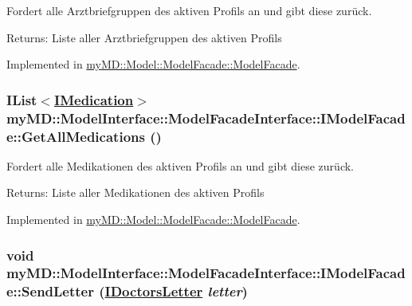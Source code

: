 Fordert alle Arztbriefgruppen des aktiven Profils an und gibt diese zur\"{u}ck. 

\begin{Desc}
\item[Returns:]Liste aller Arztbriefgruppen des aktiven Profils\end{Desc}


Implemented in \hyperlink{classmy_m_d_1_1_model_1_1_model_facade_1_1_model_facade_5975f81012b1229ab03cbfa932f3a8ae}{my\-MD::Model::Model\-Facade::Model\-Facade}.\hypertarget{interfacemy_m_d_1_1_model_interface_1_1_model_facade_interface_1_1_i_model_facade_ecff6715a9c8e9604242cc7a688c9939}{
\subsubsection[GetAllMedications]{\setlength{\rightskip}{0pt plus 5cm}IList$<$\hyperlink{interfacemy_m_d_1_1_model_interface_1_1_data_model_interface_1_1_i_medication}{IMedication}$>$ my\-MD::Model\-Interface::Model\-Facade\-Interface::IModel\-Facade::Get\-All\-Medications ()}}
\label{de/d3e/interfacemy_m_d_1_1_model_interface_1_1_model_facade_interface_1_1_i_model_facade_ecff6715a9c8e9604242cc7a688c9939}


Fordert alle Medikationen des aktiven Profils an und gibt diese zur\"{u}ck. 

\begin{Desc}
\item[Returns:]Liste aller Medikationen des aktiven Profils\end{Desc}


Implemented in \hyperlink{classmy_m_d_1_1_model_1_1_model_facade_1_1_model_facade_ecff6715a9c8e9604242cc7a688c9939}{my\-MD::Model::Model\-Facade::Model\-Facade}.\hypertarget{interfacemy_m_d_1_1_model_interface_1_1_model_facade_interface_1_1_i_model_facade_dbd560ba513112ff2c7fcf625fdf6597}{
\subsubsection[SendLetter]{\setlength{\rightskip}{0pt plus 5cm}void my\-MD::Model\-Interface::Model\-Facade\-Interface::IModel\-Facade::Send\-Letter (\hyperlink{interfacemy_m_d_1_1_model_interface_1_1_data_model_interface_1_1_i_doctors_letter}{IDoctors\-Letter} {\em letter})}}
\label{de/d3e/interfacemy_m_d_1_1_model_interface_1_1_model_facade_interface_1_1_i_model_facade_dbd560ba513112ff2c7fcf625fdf6597}


